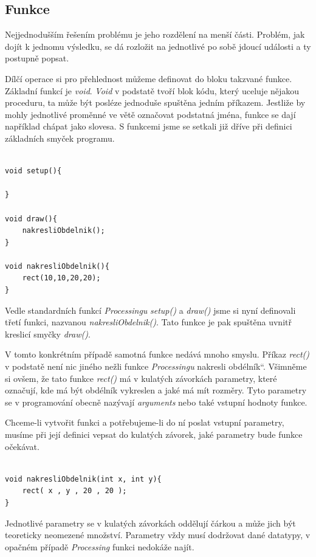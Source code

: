 \documentclass[10pt,twoside=true,open=right,cleardoublepage=empty,chapterprefix=true]{scrbook}
\renewcommand\uv[1]{\quotedblbase #1\textquotedblleft}%
\newcommand{\pododdil}[1]{\subsection{#1}\index{#1}\label{#1}}
\newcommand{\vyraz}[1]{\textit{\gls{#1}}\index{#1}\label{#1}}
\begin{document}
\pododdil{Funkce}

Nejjednodušším řešením problému je jeho rozdělení na menší části. Problém, jak dojít k jednomu výsledku, se dá rozložit na jednotlivé po sobě jdoucí události a ty postupně popsat.

Dílčí operace si pro přehlednost můžeme definovat do bloku takzvané funkce. Základní funkcí je \vyraz{void}. {\em Void} v podstatě tvoří blok kódu, který uceluje nějakou proceduru, ta může být posléze jednoduše spuštěna jedním příkazem. Jestliže by mohly jednotlivé proměnné ve větě označovat podstatná jména, funkce se dají například chápat jako slovesa. S funkcemi jsme se setkali již dříve při definici základních smyček programu.

\begin{lstlisting}

void setup(){

}

void draw(){
	nakresliObdelnik();
}

void nakresliObdelnik(){
	rect(10,10,20,20);
}

\end{lstlisting}

Vedle standardních funkcí {\em Processingu} \vyraz{setup()} a \vyraz{draw()} jsme si nyní definovali třetí funkci, nazvanou {\em nakresliObdelnik()}. Tato funkce je pak spuštěna uvnitř kreslicí smyčky \vyraz{draw()}.

V tomto konkrétním případě samotná funkce nedává mnoho smyslu. Příkaz \vyraz{rect()} v podstatě není nic jiného nežli funkce {\em Processingu} \uv{nakresli obdélník}. Všimněme si ovšem, že tato funkce \vyraz{rect()} má v kulatých závorkách parametry, které označují, kde má být obdélník vykreslen a jaké má mít rozměry. Tyto parametry se v programování obecně nazývají {\em arguments} nebo také vstupní hodnoty funkce.

Chceme-li vytvořit funkci a potřebujeme-li do ní poslat vstupní paramet\-ry, musíme při její definici vepsat do kulatých závorek, jaké paramet\-ry bude funkce očekávat.


\begin{lstlisting}

void nakresliObdelnik(int x, int y){
	rect( x , y , 20 , 20 );
}

\end{lstlisting}

Jednotlivé parametry se v kulatých závorkách oddělují čárkou a může jich být teoreticky neomezené množství. Parametry vždy musí dodržovat dané datatypy, v opačném případě {\em Processing} funkci nedokáže najít.
\end{document}
